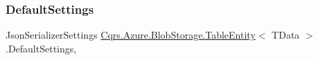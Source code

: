 \subsubsection{\texorpdfstring{Default\+Settings}{DefaultSettings}}
{\footnotesize\ttfamily Json\+Serializer\+Settings \hyperlink{classCqrs_1_1Azure_1_1BlobStorage_1_1TableEntity}{Cqrs.\+Azure.\+Blob\+Storage.\+Table\+Entity}$<$ T\+Data $>$.Default\+Settings\hspace{0.3cm}{\ttfamily [static]}, {\ttfamily [get]}}

